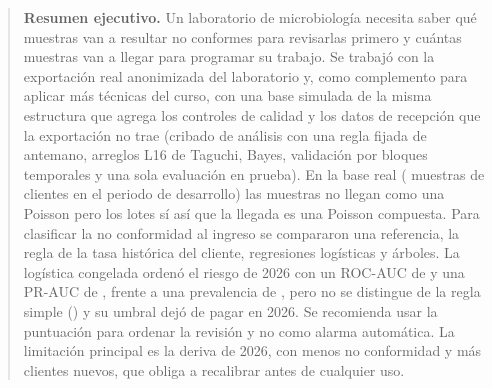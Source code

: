\begin{abstract}
\noindent
\textbf{Resumen ejecutivo.} Un laboratorio de microbiología necesita saber
qué muestras van a resultar no conformes para revisarlas primero y cuántas
muestras van a llegar para programar su trabajo. Se trabajó con la
exportación real anonimizada del laboratorio y, como complemento para aplicar
más técnicas del curso, con una base simulada de la misma estructura que
agrega los controles de calidad y los datos de recepción que la exportación
no trae (cribado de \CriCandidatos{} análisis con una regla fijada de
antemano, arreglos L16 de Taguchi, Bayes, validación por bloques temporales y
una sola evaluación en prueba). En la base real (\RealMuestras{} muestras de
\RealClientes{} clientes en el periodo de desarrollo) las muestras no
llegan como una Poisson pero los lotes sí así que la llegada es una Poisson
compuesta. Para clasificar la no conformidad al ingreso se compararon una
referencia, la regla de la tasa histórica del cliente, regresiones logísticas
y árboles. La logística congelada ordenó el riesgo de 2026 con un ROC-AUC de
\RealPruebaAUC{} y una PR-AUC de \RealPruebaAP{}, frente a una prevalencia de
\RealPruebaPrevalencia{}, pero no se distingue de la regla simple
(\RealPruebaAPRegla{}) y su umbral dejó de pagar en 2026. Se recomienda usar
la puntuación para ordenar la revisión y no como alarma automática. La
limitación principal es la deriva de 2026, con menos no conformidad y más
clientes nuevos, que obliga a recalibrar antes de cualquier uso.
\end{abstract}
